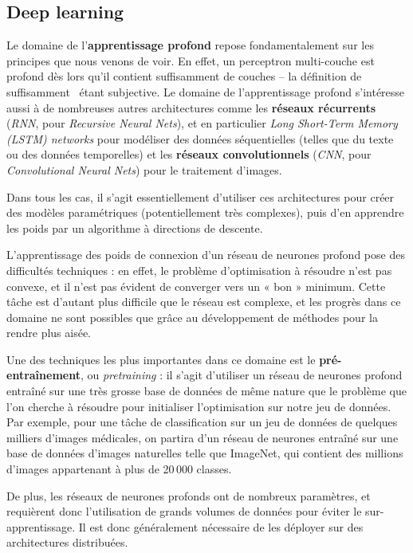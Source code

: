 \subsection{Deep learning}
Le domaine de l'\textbf{apprentissage profond} repose
fondamentalement sur les principes que nous venons de voir. En effet, un
perceptron multi-couche est profond dès lors qu'il contient suffisamment de
couches -- la définition de \og suffisamment \fg~étant subjective.  Le
domaine de l'apprentissage profond s'intéresse aussi à de nombreuses autres
architectures comme les \textbf{réseaux récurrents} ({\it RNN}, pour {\it
  Recursive Neural Nets}), et en particulier {\it Long Short-Term Memory (LSTM)
  networks} pour modéliser des données séquentielles (telles que du texte ou
des données temporelles) et les \textbf{réseaux convolutionnels} ({\it CNN},
pour {\it Convolutional Neural Nets}) pour le traitement d'images.

Dans tous les cas, il s'agit essentiellement d'utiliser ces architectures pour
créer des modèles paramétriques (potentiellement très complexes), puis d'en
apprendre les poids par un algorithme à directions de descente.

L'apprentissage des poids de connexion d'un réseau de neurones profond pose des
difficultés techniques : en effet, le problème d'optimisation à résoudre n'est
pas convexe, et il n'est pas évident de converger vers un « bon »
minimum. Cette tâche est d'autant plus difficile que le réseau est complexe, et
les progrès dans ce domaine ne sont possibles que grâce au développement de
méthodes pour la rendre plus aisée.

Une des techniques les plus importantes dans ce domaine est le
\textbf{pré-entraînement}, ou \textit{pretraining} : il s'agit d'utiliser un
réseau de neurones profond entraîné sur une très grosse base de données de même
nature que le problème que l'on cherche à résoudre pour initialiser
l'optimisation sur notre jeu de données. Par exemple, pour une tâche de
classification sur un jeu de données de quelques milliers d'images médicales,
on partira d'un réseau de neurones entraîné sur une base de données d'images
naturelles telle que ImageNet, qui contient des millions d'images appartenant à
plus de 20\,000 classes.

De plus, les réseaux de neurones profonds ont de nombreux paramètres, et
requièrent donc l'utilisation de grands volumes de données pour éviter le
sur-apprentissage. Il est donc généralement nécessaire de les déployer sur des
architectures distribuées.

